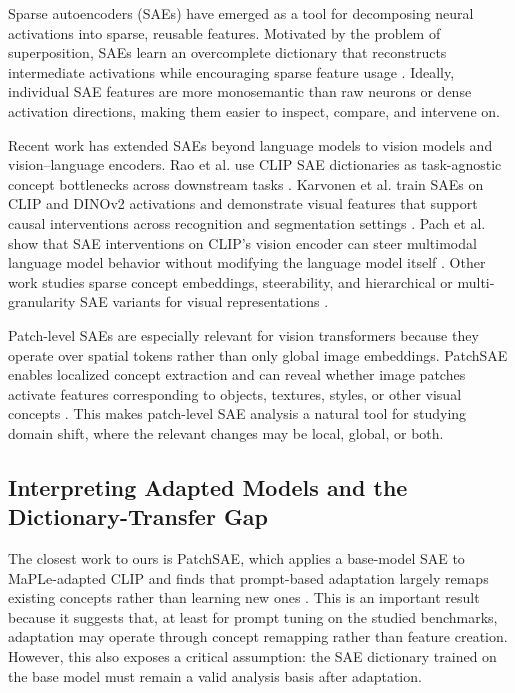 Sparse autoencoders (SAEs) have emerged as a tool for decomposing neural activations into sparse, reusable features. Motivated by the problem of superposition, SAEs learn an overcomplete dictionary that reconstructs intermediate activations while encouraging sparse feature usage \citep{elhage2022superposition, bricken2023monosemanticity, cunningham2024sparse}. Ideally, individual SAE features are more monosemantic than raw neurons or dense activation directions, making them easier to inspect, compare, and intervene on.

Recent work has extended SAEs beyond language models to vision models and vision--language encoders. Rao et al. use CLIP SAE dictionaries as task-agnostic concept bottlenecks across downstream tasks \citep{rao2024discover}. Karvonen et al. train SAEs on CLIP and DINOv2 activations and demonstrate visual features that support causal interventions across recognition and segmentation settings \citep{karvonen2025saevision}. Pach et al. show that SAE interventions on CLIP's vision encoder can steer multimodal language model behavior without modifying the language model itself \citep{pach2025monosemantic}. Other work studies sparse concept embeddings, steerability, and hierarchical or multi-granularity SAE variants for visual representations \citep{bhalla2024splice, joseph2025steering, zaremba2025msae, bussmann2025matryoshka}.

Patch-level SAEs are especially relevant for vision transformers because they operate over spatial tokens rather than only global image embeddings. PatchSAE enables localized concept extraction and can reveal whether image patches activate features corresponding to objects, textures, styles, or other visual concepts \citep{lim2024patchsae}. This makes patch-level SAE analysis a natural tool for studying domain shift, where the relevant changes may be local, global, or both.

\subsection{Interpreting Adapted Models and the Dictionary-Transfer Gap}

The closest work to ours is PatchSAE, which applies a base-model SAE to MaPLe-adapted CLIP and finds that prompt-based adaptation largely remaps existing concepts rather than learning new ones \citep{lim2024patchsae}. This is an important result because it suggests that, at least for prompt tuning on the studied benchmarks, adaptation may operate through concept remapping rather than feature creation. However, this also exposes a critical assumption: the SAE dictionary trained on the base model must remain a valid analysis basis after adaptation.

